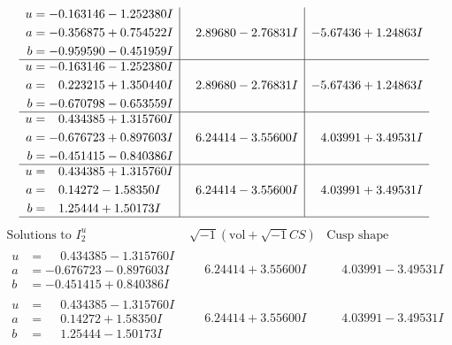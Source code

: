 \documentclass[1p]{elsarticle_modified}
\theoremstyle{definition}
\newcommand{\I}{\sqrt{-1}}
\begin{document}
$$\begin{array}{c|c|c}
\begin{aligned}
u &= -0.163146 - 1.252380 I \\
a &= -0.356875 + 0.754522 I \\
b &= -0.959590 - 0.451959 I\end{aligned}
 & \phantom{-}2.89680 - 2.76831 I & -5.67436 + 1.24863 I \\ \hline\begin{aligned}
u &= -0.163146 - 1.252380 I \\
a &= \phantom{-}0.223215 + 1.350440 I \\
b &= -0.670798 - 0.653559 I\end{aligned}
 & \phantom{-}2.89680 - 2.76831 I & -5.67436 + 1.24863 I \\ \hline\begin{aligned}
u &= \phantom{-}0.434385 + 1.315760 I \\
a &= -0.676723 + 0.897603 I \\
b &= -0.451415 - 0.840386 I\end{aligned}
 & \phantom{-}6.24414 - 3.55600 I & \phantom{-}4.03991 + 3.49531 I \\ \hline\begin{aligned}
u &= \phantom{-}0.434385 + 1.315760 I \\
a &= \phantom{-}0.14272 - 1.58350 I \\
b &= \phantom{-}1.25444 + 1.50173 I\end{aligned}
 & \phantom{-}6.24414 - 3.55600 I & \phantom{-}4.03991 + 3.49531 I\\
 \hline 
 \end{array}$$\newpage$$\begin{array}{c|c|c}  
\text{Solutions to }I^u_{2}& \I (\text{vol} + \sqrt{-1}CS) & \text{Cusp shape}\\
 \hline 
\begin{aligned}
u &= \phantom{-}0.434385 - 1.315760 I \\
a &= -0.676723 - 0.897603 I \\
b &= -0.451415 + 0.840386 I\end{aligned}
 & \phantom{-}6.24414 + 3.55600 I & \phantom{-}4.03991 - 3.49531 I \\ \hline\begin{aligned}
u &= \phantom{-}0.434385 - 1.315760 I \\
a &= \phantom{-}0.14272 + 1.58350 I \\
b &= \phantom{-}1.25444 - 1.50173 I\end{aligned}
 & \phantom{-}6.24414 + 3.55600 I & \phantom{-}4.03991 - 3.49531 I \\ \hline\begin{aligned}

\end{aligned}
\end{array}$$
\end{document}
